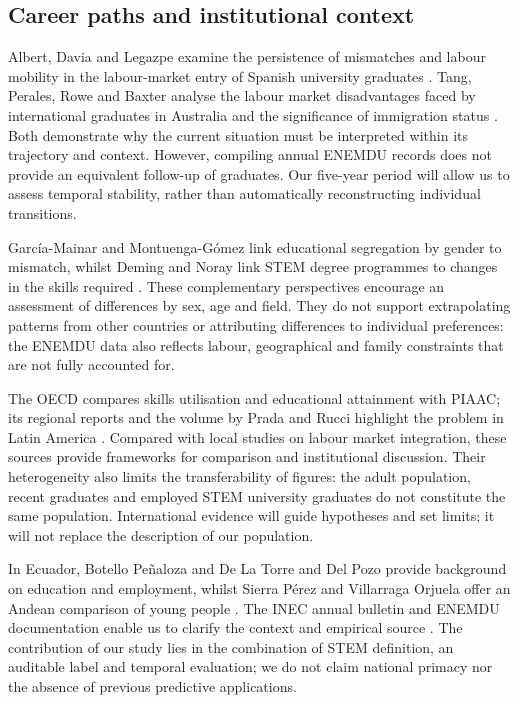 \subsection{Career paths and institutional context}



Albert, Davia and Legazpe examine the persistence of mismatches and labour mobility in the labour-market entry of Spanish university graduates \cite{Albert2023}. Tang, Perales, Rowe and Baxter analyse the labour market disadvantages faced by international graduates in Australia and the significance of immigration status \cite{Tang2022}. Both demonstrate why the current situation must be interpreted within its trajectory and context. However, compiling annual ENEMDU records does not provide an equivalent follow-up of graduates. Our five-year period will allow us to assess temporal stability, rather than automatically reconstructing individual transitions.

García-Mainar and Montuenga-Gómez link educational segregation by gender to mismatch, whilst Deming and Noray link STEM degree programmes to changes in the skills required \cite{Deming2020,GarcaMainar2026}. These complementary perspectives encourage an assessment of differences by sex, age and field. They do not support extrapolating patterns from other countries or attributing differences to individual preferences: the ENEMDU data also reflects labour, geographical and family constraints that are not fully accounted for.

The OECD compares skills utilisation and educational attainment with PIAAC; its regional reports and the volume by Prada and Rucci highlight the problem in Latin America \cite{OECD2019,OECD2023,OECD2024,PradaRucci2025}. Compared with local studies on labour market integration, these sources provide frameworks for comparison and institutional discussion. Their heterogeneity also limits the transferability of figures: the adult population, recent graduates and employed STEM university graduates do not constitute the same population. International evidence will guide hypotheses and set limits; it will not replace the description of our population.

In Ecuador, Botello Peñaloza and De La Torre and Del Pozo provide background on education and employment, whilst Sierra Pérez and Villarraga Orjuela offer an Andean comparison of young people \cite{BotelloPealoza2016,DeLaTorreB2025,SierraPrez2024}. The INEC annual bulletin and ENEMDU documentation enable us to clarify the context and empirical source \cite{Censos2025,InstitutoNacionaldeEstadsticayCensos2026}. The contribution of our study lies in the combination of STEM definition, an auditable label and temporal evaluation; we do not claim national primacy nor the absence of previous predictive applications.



